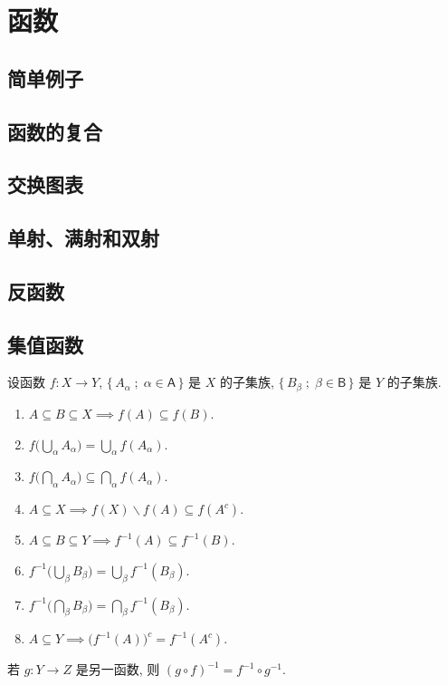 \section{函数}

\subsection{简单例子}

\subsection{函数的复合}

\subsection{交换图表}

\subsection{单射、满射和双射}

\subsection{反函数}

\subsection{集值函数}

\begin{proposition}\label{prop:property-of-set-valued-function}
    设函数 \(f \colon X \to Y\), \(\{\, A_\alpha \;;\; \alpha \in \mathsf A \,\}\) 是 \(X\) 的子集族, \(\{\, B_\beta \;;\; \beta \in \mathsf B \,\}\) 是 \(Y\) 的子集族.
    \begin{enumerate}
        \item \(A \subseteq B \subseteq X \implies f(A) \subseteq f(B)\).
        \item \(f \bigl(\bigcup_\alpha A_\alpha\bigr) = \bigcup_\alpha f(A_\alpha)\).
        \item \(f \bigl(\bigcap_\alpha A_\alpha\bigr) \subseteq \bigcap_\alpha f(A_\alpha)\).
        \item \(A \subseteq X \implies f(X) \backslash f(A) \subseteq f(A^c)\).
        \item \(A \subseteq B \subseteq Y \implies f^{- 1}(A) \subseteq f^{- 1}(B)\).
        \item \(f^{- 1} \bigl(\bigcup_\beta B_\beta\bigr) = \bigcup_\beta f^{- 1}(B_\beta)\).
        \item \(f^{- 1} \bigl(\bigcap_\beta B_\beta\bigr) = \bigcap_\beta f^{- 1}(B_\beta)\).
        \item \(A \subseteq Y \implies \bigl(f^{- 1}(A)\bigr)^c = f^{- 1}(A^c)\).
    \end{enumerate}
    若 \(g \colon Y \to Z\) 是另一函数, 则 \((g \circ f)^{- 1} = f^{- 1} \circ g^{- 1}\).
\end{proposition}

